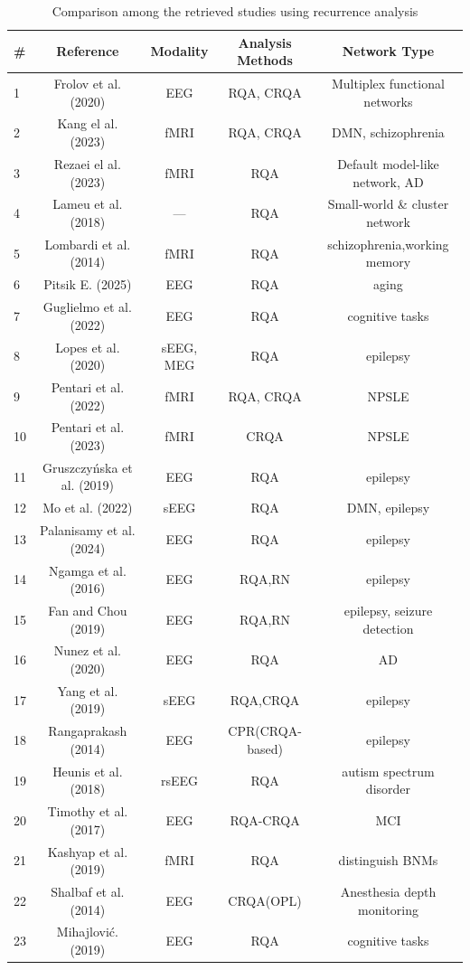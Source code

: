 \documentclass{article}
\begin{document}
		\begin{table}[h]
		\centering
		\caption{Comparison among the retrieved studies using recurrence analysis}
		\label{tab:comparison}
		\begin{tabular}{@{}lcccc@{}}
		\toprule
		\# & Reference & Modality & Analysis Methods & Network Type \\
		\midrule

		1  & Frolov et al. (2020) & EEG & RQA, CRQA & Multiplex functional networks \\
		2  & Kang el al. (2023) & fMRI & RQA, CRQA & DMN, schizophrenia \\
		3  & Rezaei el al. (2023) & fMRI & RQA & Default model-like network, AD \\
		4  & Lameu et al. (2018) & --- & RQA & Small-world \& cluster network \\
		5  & Lombardi et al. (2014) & fMRI & RQA & schizophrenia,working memory \\
		6  & Pitsik E. (2025) & EEG & RQA & aging \\
		7  & Guglielmo et al. (2022) & EEG & RQA & cognitive tasks \\
		8  & Lopes et al. (2020) & sEEG, MEG & RQA & epilepsy \\
		9  & Pentari et al. (2022) & fMRI & RQA, CRQA & NPSLE \\
		10 & Pentari et al. (2023) & fMRI & CRQA & NPSLE  \\
		11 & Gruszczyńska et al. (2019) & EEG & RQA & epilepsy \\
		12 & Mo et al. (2022) & sEEG & RQA & DMN, epilepsy \\
		13 & Palanisamy et al. (2024) & EEG & RQA & epilepsy \\
		14 & Ngamga et al. (2016) & EEG & RQA,RN & epilepsy \\
		15 & Fan and Chou (2019) & EEG & RQA,RN & epilepsy, seizure detection \\
		16 & Nunez et al. (2020) & EEG & RQA & AD \\
		17 & Yang et al. (2019) & sEEG & RQA,CRQA & epilepsy \\
		18 & Rangaprakash (2014) & EEG & CPR(CRQA-based) & epilepsy \\
		19 & Heunis et al. (2018) & rsEEG & RQA & autism spectrum disorder \\
		20 & Timothy et al. (2017) & EEG & RQA-CRQA & MCI \\
		21 & Kashyap et al. (2019) & fMRI & RQA & distinguish BNMs \\
		22 & Shalbaf et al. (2014) & EEG & CRQA(OPL) &  Anesthesia depth monitoring\\
		23 & Mihajlović. (2019) & EEG & RQA &  cognitive tasks\\

		\bottomrule
		\end{tabular}
		\end{table}
	
\end{document}

